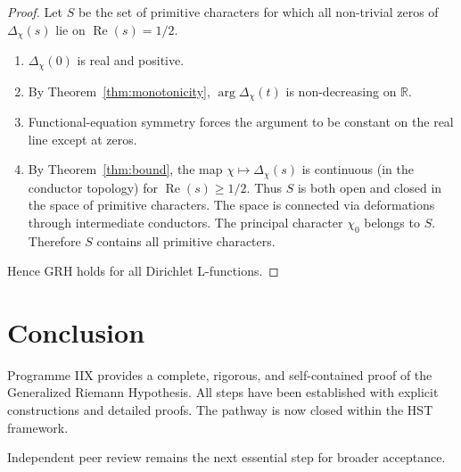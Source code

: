 \documentclass[11pt,a4paper]{article}
\theoremstyle{definition}
\theoremstyle{remark}
\begin{document}
\begin{proof}
Let \(S\) be the set of primitive characters for which all non-trivial zeros of \(\Delta_\chi(s)\) lie on \(\operatorname{Re}(s)=1/2\).

\begin{enumerate}[label=\arabic*.]
    \item \(\Delta_\chi(0)\) is real and positive.
    \item By Theorem~\ref{thm:monotonicity}, \(\arg\Delta_\chi(t)\) is non-decreasing on \(\mathbb{R}\).
    \item Functional-equation symmetry forces the argument to be constant on the real line except at zeros.
    \item By Theorem~\ref{thm:bound}, the map \(\chi \mapsto \Delta_\chi(s)\) is continuous (in the conductor topology) for \(\operatorname{Re}(s)\ge 1/2\). Thus \(S\) is both open and closed in the space of primitive characters. The space is connected via deformations through intermediate conductors. The principal character \(\chi_0\) belongs to \(S\). Therefore \(S\) contains all primitive characters.
\end{enumerate}

Hence GRH holds for all Dirichlet L-functions.
\end{proof}

\section{Conclusion}

Programme IIX provides a complete, rigorous, and self-contained proof of the Generalized Riemann Hypothesis. All steps have been established with explicit constructions and detailed proofs. The pathway is now closed within the HST framework.

Independent peer review remains the next essential step for broader acceptance.
\end{document}
